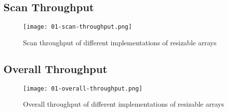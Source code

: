 \endgroup

\begingroup

\subsection{Scan Throughput}

\begin{center}
	\begin{figure}[H]
		\texttt{[image: 01-scan-throughput.png]}
		\caption{Scan throughput of different implementations of resizable arrays}
		\label{fig:scan-throughput}
	\end{figure}
\end{center}

\endgroup

\begingroup

\subsection{Overall Throughput}

\begin{center}
	\begin{figure}[H]
		\texttt{[image: 01-overall-throughput.png]}
		\caption{Overall throughput of different implementations of resizable arrays}
		\label{fig:overall-throughput}
	\end{figure}
\end{center}

\endgroup
